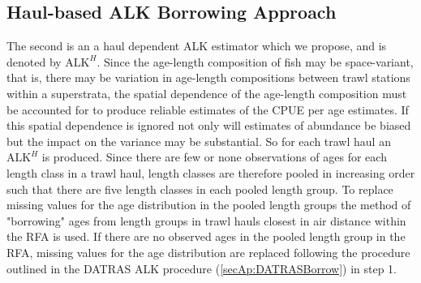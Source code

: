 \documentclass[a4paper 12pt]{article}
\numberwithin{equation}{section}
\begin{document}
\begin{appendices}
\subsection{Haul-based ALK Borrowing Approach}
\label{secAp:oursBorrow}
\indent  The second is an a haul dependent ALK estimator which we propose, and is denoted by $\mathrm{ALK}^{H}$. Since the age-length composition of fish may be space-variant, that is, there may be variation in age-length compositions between trawl stations within a superstrata, the spatial dependence of the age-length composition must be accounted for to produce reliable estimates of the CPUE per age estimates. If this spatial dependence is ignored not only will estimates of abundance be biased but the impact on the variance may be substantial. So for each trawl haul an $\mathrm{ALK}^{H}$ is produced. Since there are few or none observations of ages for each length class in a trawl haul, length classes are therefore pooled in increasing order such that there are five length classes in each pooled length group. To replace missing values for the age distribution in the pooled length groups the method of "borrowing" ages from length groups in trawl hauls closest in air distance within the RFA is used. If there are no observed ages in the pooled length group in the RFA, missing values for the age distribution are replaced following the procedure outlined in the DATRAS ALK procedure (\ref{secAp:DATRASBorrow}) in step 1.  
\clearpage

\end{appendices}
\end{document}

